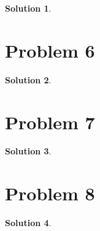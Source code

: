 \documentclass{article}
\theoremstyle{definition}
\newtheorem{solution}{Solution} %
\begin{document}
\begin{solution}
\end{solution}

\newpage


\section*{Problem 6}

\begin{solution}
\end{solution}

\newpage


\section*{Problem 7}

\begin{solution}
\end{solution}

\newpage


\section*{Problem 8}

\begin{solution}
\end{solution}
\end{document}
